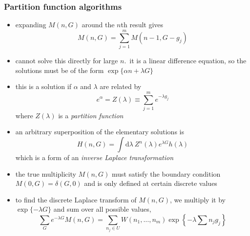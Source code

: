 \documentclass[../jaynes_prob_theory_notes.tex]{subfiles}
\begin{document}
                \subsubsection{Partition function algorithms}
                    \begin{itemize}
                        \item expanding $M(n,G)$ around the $n$th result gives
                            \begin{equation*}
                                M(n,G) = \sum\limits^{m}_{j=1} M(n-1, G-g_j)
                            \end{equation*}
                        \item cannot solve this directly for large $n$.\ it is a linear difference equation, so the solutions must be of the form $\exp\{{\alpha}n + {\lambda}G\}$
                        \item this is a solution if $\alpha$ and $\lambda$ are related by
                            \begin{equation*}
                                e^{\alpha} = Z(\lambda) \equiv \sum\limits^{m}_{j=1} e^{-{\lambda}g_j}
                            \end{equation*}
                            where $Z(\lambda)$ is a \textit{partition function}
                        \item an arbitrary superposition of the elementary solutions is
                            \begin{equation*}
                                H(n,G) = \int \mathrm{d}{\lambda}~Z^{n}(\lambda)e^{{\lambda}G}h(\lambda)
                            \end{equation*}
                            which is a form of an \textit{inverse Laplace transformation}
                        \item the true multiplicity $M(n,G)$ must satisfy the boundary condition $M(0,G) = \delta (G,0)$ and is only defined at certain discrete values
                        \item to find the discrete Laplace transform of $M(n,G)$, we multiply it by $\exp \{-\lambda G\}$ and sum over all possible values,
                            \begin{equation}
                                \label{11}
                                \sum\limits_{G} e^{-\lambda G}M(n,G) = \sum\limits_{n_j \in U} W(n_1, \ldots, n_m) \exp \left \{ -\lambda \sum n_j g_j \right \}
                            \end{equation}

\end{itemize}
\end{document}
